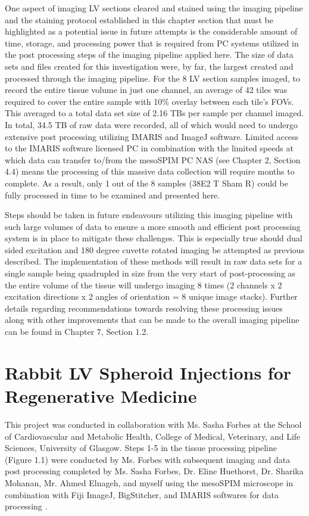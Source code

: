 One aspect of imaging LV sections cleared and stained using the imaging pipeline and the staining protocol established in this chapter section that must be highlighted as a potential issue in future attempts is the considerable amount of time, storage, and processing power that is required from PC systems utilized in the post processing steps of the imaging pipeline applied here. The size of data sets and files created for this investigation were, by far, the largest created and processed through the imaging pipeline. For the 8 LV section samples imaged, to record the entire tissue volume in just one channel, an average of 42 tiles was required to cover the entire sample with 10\% overlay between each tile's FOVs. This averaged to a total data set size of 2.16 TBs per sample per channel imaged. In total, 34.5 TB of raw data were recorded, all of which would need to undergo extensive post processing utilizing IMARIS and ImageJ software. Limited access to the IMARIS software licensed PC in combination with the limited speeds at which data can transfer to/from the mesoSPIM PC NAS (see Chapter 2, Section 4.4) means the processing of this massive data collection will require months to complete. As a result, only 1 out of the 8 samples (38E2 T Sham R) could be fully processed in time to be examined and presented here. 

Steps should be taken in future endeavours utilizing this imaging pipeline with such large volumes of data to ensure a more smooth and efficient post processing system is in place to mitigate these challenges. This is especially true should dual sided excitation and 180 degree cuvette rotated imaging be attempted as previous described. The implementation of these methods will result in raw data sets for a single sample being quadrupled in size from the very start of post-processing as the entire volume of the tissue will undergo imaging 8 times (2 channels x 2 excitation directions x 2 angles of orientation = 8 unique image stacks). Further details regarding recommendations towards resolving these processing issues along with other improvements that can be made to the overall imaging pipeline can be found in Chapter 7, Section 1.2.



\section{Rabbit LV Spheroid Injections for Regenerative Medicine}
This project was conducted in collaboration with Ms. Sasha Forbes at the School of Cardiovascular and Metabolic Health, College of Medical, Veterinary, and Life Sciences, University of Glasgow. Steps 1-5 in the tissue processing pipeline (Figure 1.1) were conducted by Ms. Forbes with subsequent imaging and data post processing completed by Ms. Sasha Forbes, Dr. Eline Huethorst, Dr. Sharika Mohanan, Mr. Ahmed Elnageh, and myself using the mesoSPIM microscope in combination with Fiji ImageJ, BigStitcher, and IMARIS softwares for data processing \cite{schindelin_fiji_2012,noauthor_imaris_2024, horl_bigstitcher_2019}. 

